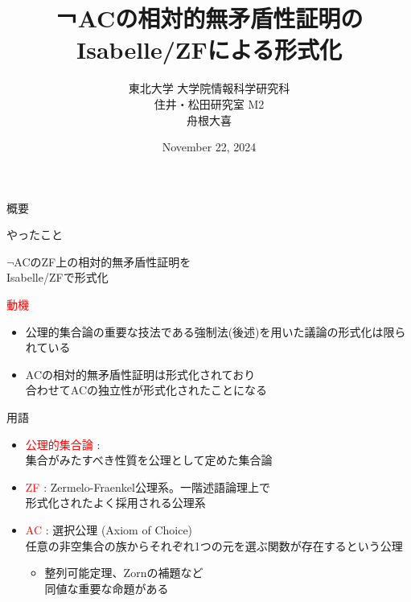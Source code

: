 \documentclass[17pt]{beamer}
\title{￢ACの相対的無矛盾性証明のIsabelle/ZFによる形式化}
\author{東北大学 大学院情報科学研究科\\ 住井・松田研究室 M2\\ 舟根大喜}
\date{November 22, 2024}
\begin{document}
\maketitle

\begin{frame}{概要}
    \vspace{-5pt}
    \begin{itembox}[l]{やったこと}
        \begin{center}
        \vspace{-3pt}
        $\neg$ACのZF上の相対的無矛盾性証明を\\
        Isabelle/ZFで形式化
        \vspace{-3pt}
        \end{center}
    \end{itembox}
    \vspace{-5pt}
    {\small
    \textcolor{red}{動機}
    \begin{itemize}[itemsep=1pt]
    \vspace{-5pt}
        \item 公理的集合論の重要な技法である強制法(後述)を用いた議論の形式化は限られている
        \item ACの相対的無矛盾性証明は形式化されており\\
        合わせてACの独立性が形式化されたことになる
    \end{itemize}}
\end{frame}

\begin{frame}{用語}\,
    \vspace{-20pt}
    {\small 
        \begin{itemize}[itemsep=8pt]
            \item \textcolor{red}{公理的集合論} : \\
            集合がみたすべき性質を公理として定めた集合論
            \item \textcolor{red}{ZF} : 
            Zermelo-Fraenkel公理系。一階述語論理上で\\
            形式化されたよく採用される公理系
            \item \textcolor{red}{AC} : 選択公理 (Axiom of Choice)\\
            任意の非空集合の族からそれぞれ1つの元を選ぶ関数が存在するという公理
            \begin{itemize} 
                \item 整列可能定理、Zornの補題など\\同値な重要な命題がある
            \end{itemize}
        \end{itemize}
    }
\end{frame}
\end{document}
